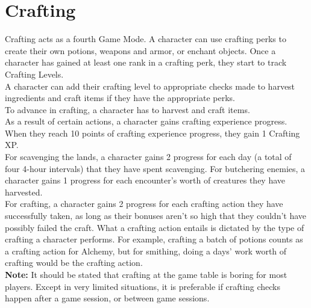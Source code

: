 \chapter{Crafting}\label{ch:crafting}
Crafting acts as a fourth Game Mode.
A character can use crafting perks to create their own potions, weapons and armor, or enchant objects.
Once a character has gained at least one rank in a crafting perk, they start to track Crafting Levels.\\
A character can add their crafting level to appropriate checks made to harvest ingredients and craft items if they have the appropriate perks.\\
To advance in crafting, a character has to harvest and craft items.\\
As a result of certain actions, a character gains crafting experience progress.
When they reach 10 points of crafting experience progress, they gain 1 Crafting XP.\\
For scavenging the lands, a character gains 2 progress for each day (a total of four 4-hour intervals) that they have spent scavenging.
For butchering enemies, a character gains 1 progress for each encounter's worth of creatures they have harvested.\\
For crafting, a character gains 2 progress for each crafting action they have successfully taken, as long as their bonuses aren't so high that they couldn't have possibly failed the craft.
What a crafting action entails is dictated by the type of crafting a character performs.
For example, crafting a batch of potions counts as a crafting action for Alchemy, but for smithing, doing a days' work worth of crafting would be the crafting action.\\
\textbf{Note:} It should be stated that crafting at the game table is boring for most players.
Except in very limited situations, it is preferable if crafting checks happen after a game session, or between game sessions.